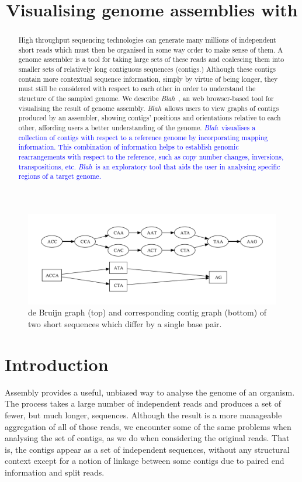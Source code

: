\documentclass{article}
\title{Visualising genome assemblies with \Blah}
\author{}
\def\Blah{\textit{Blah}\ }
\begin{document}
\maketitle

\begin{abstract}
High throughput sequencing technologies can generate many millions of independent short reads which must then be organised in some way order to make sense of them.
A genome assembler is a tool for taking large sets of these reads and coalescing them into smaller sets of relatively long contiguous sequences (contigs.)
Although these contigs contain more contextual sequence information, simply by virtue of being longer, they must still be considered with respect to each other in order to understand the structure of the sampled genome. 
We describe \Blah, an web browser-based tool for visualising the result of genome assembly.
\Blah allows users to view graphs of contigs produced by an assembler, showing contigs' positions and orientations relative to each other, affording users a better understanding of the genome.
\textcolor{blue}{\Blah visualises a collection of contigs with respect to a reference genome by incorporating mapping information. This combination of information helps to establish genomic rearrangements with respect to the reference, such as copy number changes, inversions, transpositions, etc.
\Blah is an exploratory tool that aids the user in analysing specific regions of a target genome.}

\end{abstract}

\begin{figure}[t]
\includegraphics[width=\textwidth]{graph-k3.pdf}
\caption{de Bruijn graph (top) and corresponding contig graph (bottom) of two short sequences which differ by a single base pair.}
\label{fig:bubble}
\end{figure}

\section{Introduction}
Assembly provides a useful, unbiased way to analyse the genome of an organism. 
The process takes a large number of independent reads and produces a set of fewer, but much longer, sequences.
Although the result is a more manageable aggregation of all of those reads, we encounter some of the same problems 
when analysing the set of contigs, as we do when considering the original reads.
That is, the contigs appear as a set of independent sequences, without any structural context except for a notion of linkage between some contigs due to paired end information and split reads.
\end{document}
